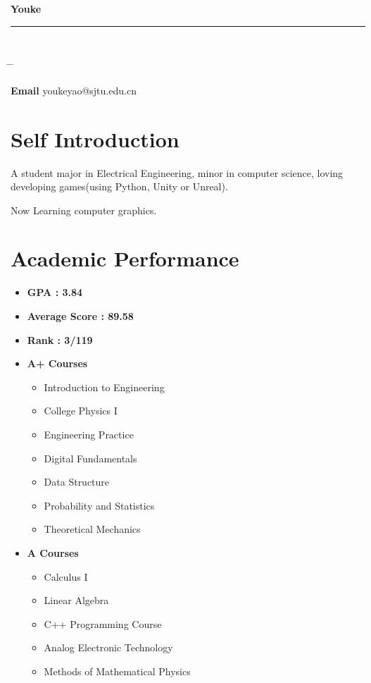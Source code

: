 \documentclass{article}
\begin{document}
{\huge{\color{slateblue}\textbf{Youke}}}\\
\rule{\textwidth}{0.5mm}\\


\parbox{0.5\textwidth}{
\begin{tabbing}
\hspace{3cm} \= \hspace{4cm} \= \kill

{\bf Email} \> youkeyao@sjtu.edu.cn \\

\end{tabbing}
}


\section*{Self Introduction}
A student major in Electrical Engineering, minor in computer science,
loving developing games(using Python, Unity or Unreal).

Now Learning computer graphics.


\section*{Academic Performance}
\begin{itemize}
    \item {\bf GPA :  3.84}
    \item {\bf Average Score : 89.58}
    \item {\bf Rank : 3/119}
    \item {\bf A+ Courses}
    \begin{itemize}
        \item Introduction to Engineering
        \item College Physics I
        \item Engineering Practice
        \item Digital Fundamentals
        \item Data Structure
        \item Probability and Statistics
        \item Theoretical Mechanics
    \end{itemize}
    \item {\bf A Courses}
    \begin{itemize}
        \item Calculus I
        \item Linear Algebra
        \item C++ Programming Course
        \item Analog Electronic Technology
        \item Methods of Mathematical Physics
    \end{itemize}
\end{itemize}
\end{document}
